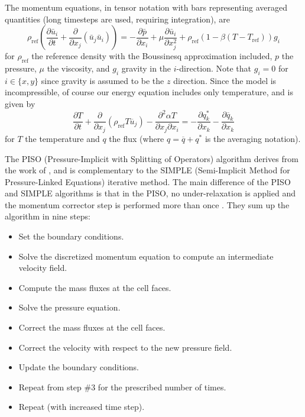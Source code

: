 \documentclass[pre,twocolumn,twoside,byrevtex,superscriptaddress]{revtex4}
\newcommand{\partialdiff}[2]{\frac{\partial #1}{\partial #2}}
\newcommand{\rhoref}{\rho_{\text{ref}}}
\begin{document}
The momentum equations, in tensor notation with bars representing averaged quantities (long timesteps are used, requiring integration), are
\begin{equation} \rho_\text{ref} \left ( \frac{\partial \bar{u}_i}{\partial t} + \frac{\partial}{\partial x_j} \left( \bar{u}_j \bar{u}_i \right) \right )
= -\frac{\partial \bar{p}} {\partial{x_i}} +  \mu \frac{\partial \bar{u}_i}{\partial x_j^2} + \rhoref \left(1 - \beta (T - T_\text{ref})\right) g_i \end{equation}
for $\rho_\text{ref}$ the reference density with the Boussinesq approximation included, $p$ the pressure, $\mu$ the viscosity, and $g_i$ gravity in the $i$-direction.
Note that $g_i = 0$ for $i \in \{ x,y\}$ since gravity is assumed to be the $z$ direction.
Since the model is incompressible, of course our energy equation includes only temperature, and is given by
                            \begin{equation} \partialdiff{T}{t} + \partialdiff{}{x_j} \left ( \rhoref T \overline{u}_j \right ) - \frac{\partial ^2 \alpha T}{\partial x_j \partial x_i}
  =
  - \frac{\partial q_k^*}{\partial x_k}
  - \frac{\partial \overline{q}_k}{\partial x_k}
\end{equation}
for $T$ the temperature and $q$ the flux (where $q = \overline{q} + q^*$ is the averaging notation).

The PISO (Pressure-Implicit with Splitting of Operators) algorithm derives from the work of \cite{issa1986solution}, and is complementary to the SIMPLE (Semi-Implicit Method for Pressure-Linked Equations) \cite{patankar1972calculation} iterative method.
The main difference of the PISO and SIMPLE algorithms is that in the PISO, no under-relaxation is applied and the momentum corrector step is performed more than once \cite{ferziger1996computational}.
They sum up the algorithm in nine steps:
\begin{itemize}
\item Set the boundary conditions.
\item Solve the discretized momentum equation to compute an intermediate velocity field.
\item Compute the mass fluxes at the cell faces.
\item Solve the pressure equation.
\item Correct the mass fluxes at the cell faces.
\item Correct the velocity with respect to the new pressure field.
\item Update the boundary conditions.
\item Repeat from step \#3 for the prescribed number of times.
\item Repeat (with increased time step).
\end{itemize}
\end{document}
